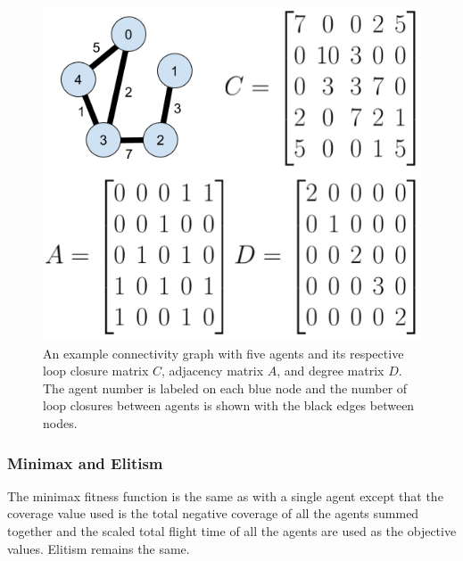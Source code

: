 \documentclass[letterpaper, 10 pt, conference]{ieeeconf}  %
\begin{document}
\begin{figure}
\centering
\includegraphics[width=0.8\linewidth]{figures/connectivity.png}
\caption{An example connectivity graph with five agents and its respective loop closure matrix $C$, adjacency matrix $A$, and degree matrix $D$. The agent number is labeled on each blue node and the number of loop closures between agents is shown with the black edges between nodes.
}
\label{fig:connectivity}
\end{figure}


\subsubsection{Minimax and Elitism}
The minimax fitness function is the same as with a single agent except that the coverage value used is the total negative coverage of all the agents summed together and the scaled total flight time of all the agents are used as the objective values. Elitism remains the same.
\end{document}

